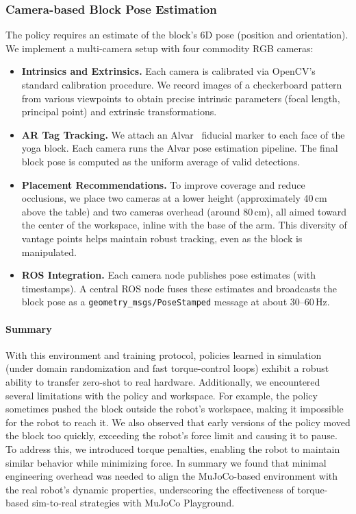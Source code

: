 \subsubsection{Camera-based Block Pose Estimation}

The policy requires an estimate of the block’s 6D pose (position and orientation). We implement a multi-camera setup with four commodity RGB cameras:
\begin{itemize}[leftmargin=1em]
    \item \textbf{Intrinsics and Extrinsics.} Each camera is calibrated via OpenCV’s standard calibration procedure. We record images of a checkerboard pattern from various viewpoints to obtain precise intrinsic parameters (focal length, principal point) and extrinsic transformations.  
    \item \textbf{AR Tag Tracking.} We attach an Alvar~\citep{artrackalvar} fiducial marker to each face of the yoga block. Each camera runs the Alvar pose estimation pipeline. The final block pose is computed as the uniform average of valid detections.  
    \item \textbf{Placement Recommendations.} To improve coverage and reduce occlusions, we place two cameras at a lower height (approximately 40\,cm above the table) and two cameras overhead (around 80\,cm), all aimed toward the center of the workspace, inline with the base of the arm. This diversity of vantage points helps maintain robust tracking, even as the block is manipulated.  
    \item \textbf{ROS Integration.} Each camera node publishes pose estimates (with timestamps). A central ROS node fuses these estimates and broadcasts the block pose as a \texttt{geometry\_msgs/PoseStamped} message at about 30--60\,Hz.  
\end{itemize}

\paragraph{Summary} With this environment and training protocol, policies learned in simulation (under domain randomization and fast torque-control loops) exhibit a robust ability to transfer zero-shot to real hardware. Additionally, we encountered several limitations with the policy and workspace. For example, the policy sometimes pushed the block outside the robot’s workspace, making it impossible for the robot to reach it. We also observed that early versions of the policy moved the block too quickly, exceeding the robot’s force limit and causing it to pause. To address this, we introduced torque penalties, enabling the robot to maintain similar behavior while minimizing force. In summary we found that minimal engineering overhead was needed to align the MuJoCo-based environment with the real robot’s dynamic properties, underscoring the effectiveness of torque-based sim-to-real strategies with MuJoCo Playground.

